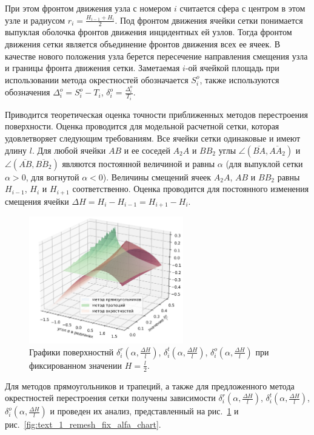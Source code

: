 \documentclass[a4paper,14pt]{extarticle}                     %
\theoremstyle{plain}                                         %
\begin{document}
При этом фронтом движения узла с номером $i$ считается сфера с центром в этом узле и радиусом $r_i = \frac{H_{i - 1} + H_i}{2}$.
Под фронтом движения ячейки сетки понимается выпуклая оболочка фронтов движения инцидентных ей узлов.
Тогда фронтом движения сетки является объединение фронтов движения всех ее ячеек.
В качестве нового положения узла берется пересечение направления смещения узла и границы фронта движения сетки.
Заметаемая $i$-ой ячейкой площадь при использовании метода окрестностей обозначается $S_i^o$, также используются обозначения $\Delta_i^o = S_i^o - T_i$, $\delta_i^o = \frac{\Delta_i^o}{T_i}$.

Приводится теоретическая оценка точности приближенных методов перестроения поверхности.
Оценка проводится для модельной расчетной сетки, которая удовлетворяет следующим требованиям.
Все ячейки сетки одинаковые и имеют длину $l$.
Для любой ячейки $AB$ и ее соседей $A_2A$ и $BB_2$ углы $\angle (\overline{BA}, \overline{AA_2})$ и $\angle (\overline{AB}, \overline{BB_2})$ являются постоянной величиной и равны $\alpha$ (для выпуклой сетки $\alpha > 0$, для вогнутой $\alpha < 0$).
Величины смещений ячеек $A_2A$, $AB$ и $BB_2$ равны $H_{i - 1}$, $H_i$ и $H_{i + 1}$ соответственно.
Оценка проводится для постоянного изменения смещения ячейки $\Delta H = H_i - H_{i - 1} = H_{i + 1} - H_i$.

\begin{figure}[ht]
\centering
\includegraphics[width=0.6\textwidth]{pics/text_1_remesh_2d/remesh_3d_chart.png}
\singlespacing
{}\caption{Графики поверхностнй $\delta_i^r(\alpha, \frac{\Delta H}{l})$, $\delta_i^t(\alpha, \frac{\Delta H}{l})$, $\delta_i^o(\alpha, \frac{\Delta H}{l})$ при фиксированном значении $H = \frac{l}{2}$.}
\label{fig:text_1_remesh_3d_main_chart}
\end{figure}

Для методов прямоугольников и трапеций, а также для предложенного метода окрестностей перестроения сетки получены зависимости $\delta_i^r(\alpha, \frac{\Delta H}{l})$, $\delta_i^t(\alpha, \frac{\Delta H}{l})$, $\delta_i^o(\alpha, \frac{\Delta H}{l})$ и проведен их анализ, представленный на рис.~\ref{fig:text_1_remesh_3d_main_chart} и рис.~\ref{fig:text_1_remesh_fix_alfa_chart}.
\end{document}
